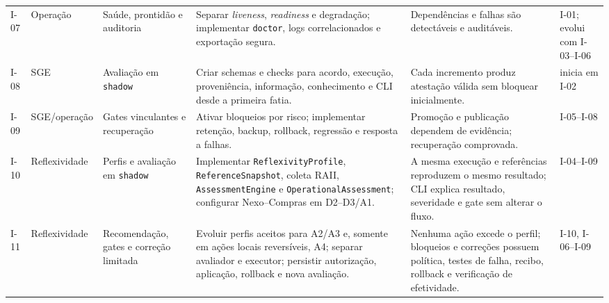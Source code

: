 \documentclass[11pt,a4paper,oneside]{article}
\begin{document}
\begin{landscape}
\begin{longtable}{P{1.4cm}P{2.4cm}P{4.2cm}P{6.0cm}P{5.4cm}P{2.5cm}}
I-07 & Operação & Saúde, prontidão e auditoria & Separar \textit{liveness}, \textit{readiness} e degradação; implementar \texttt{doctor}, logs correlacionados e exportação segura. & Dependências e falhas são detectáveis e auditáveis. & I-01; evolui com I-03--I-06 \\
I-08 & SGE & Avaliação em \texttt{shadow} & Criar schemas e checks para acordo, execução, proveniência, informação, conhecimento e CLI desde a primeira fatia. & Cada incremento produz atestação válida sem bloquear inicialmente. & inicia em I-02 \\
I-09 & SGE/operação & Gates vinculantes e recuperação & Ativar bloqueios por risco; implementar retenção, backup, rollback, regressão e resposta a falhas. & Promoção e publicação dependem de evidência; recuperação comprovada. & I-05--I-08 \\
I-10 & Reflexividade & Perfis e avaliação em \texttt{shadow} & Implementar \texttt{ReflexivityProfile}, \texttt{ReferenceSnapshot}, coleta RAII, \texttt{AssessmentEngine} e \texttt{OperationalAssessment}; configurar Nexo--Compras em D2--D3/A1. & A mesma execução e referências reproduzem o mesmo resultado; CLI explica resultado, severidade e gate sem alterar o fluxo. & I-04--I-09 \\
I-11 & Reflexividade & Recomendação, gates e correção limitada & Evoluir perfis aceitos para A2/A3 e, somente em ações locais reversíveis, A4; separar avaliador e executor; persistir autorização, aplicação, rollback e nova avaliação. & Nenhuma ação excede o perfil; bloqueios e correções possuem política, testes de falha, recibo, rollback e verificação de efetividade. & I-10, I-06--I-09 \\
\bottomrule
\end{longtable}
\end{landscape}
\end{document}

